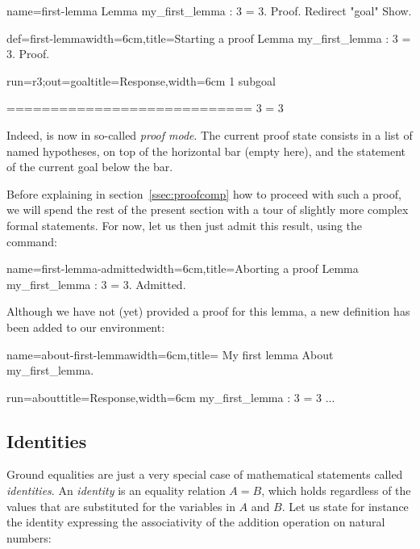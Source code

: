 \begin{coqdef}{name=first-lemma}
Lemma my_first_lemma : 3 = 3.
Proof. Redirect "goal" Show.
\end{coqdef}
\begin{coq}{def=first-lemma}{width=6cm,title=Starting a proof}
Lemma my_first_lemma : 3 = 3.
Proof.
\end{coq}
\begin{coqout}{run=r3;out=goal}{title=Response,width=6cm}
1 subgoal

  ============================
   3 = 3
\end{coqout}
Indeed, \Coq{} is now in so-called \emph{proof mode}. The
current proof state consists in a list of named hypotheses, on top of
the horizontal bar (empty here), and the statement of the current goal
below the bar.

Before explaining in section~\ref{ssec:proofcomp} how to proceed with
such a proof, we will spend the rest of the present section with
a tour of slightly more complex formal statements.
For now, let us then just admit this result, using the 
command:

\begin{coq}{name=first-lemma-admitted}{width=6cm,title=Aborting a proof}
Lemma my_first_lemma : 3 = 3.
Admitted.
\end{coq}

Although we have not (yet) provided a proof for this lemma, a new
definition has been added to our environment:

\begin{coq}{name=about-first-lemma}{width=6cm,title= My first lemma}
About my_first_lemma.
\end{coq}
\begin{coqout}{run=about}{title=Response,width=6cm}
my_first_lemma : 3 = 3
...
\end{coqout}


\subsection{Identities}\label{ssec:id}


Ground equalities are just a very special case of mathematical
statements called \emph{identities}. An \emph{identity} is an equality
relation $A = B$, which holds regardless of the values that are
substituted for the variables in $A$ and $B$.
Let us state for instance the identity expressing the associativity of
the  addition operation on natural numbers:

